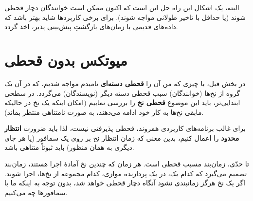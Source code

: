 \documentclass{book}
\newcommand{\clearemptydoublepage}{\newpage\cleardoublepage}
\begin{document}
    البته، یک اشکال این راه حل این است که اکنون ممکن است خوانندگان دچار قحطی شوند (یا حداقل با تاخیر طولانی مواجه شوند).  
    برای برخی کاربردها شاید بهتر باشد که داده‌های قدیمی با زمان‌های بازگشتِ پیش‌بینی‌ پذیر، اخذ گردد. 


\clearemptydoublepage
\section{میوتکس بدون قحطی}
\label{props}

    در بخش قبل، با چیزی که من آن را \textbf{قحطی دسته‌ای} نامیدم مواجه شدیم، که در آن یک گروه از نخ‌ها (خوانندگان) 
    سبب قحطی دسته دیگر (نویسندگان) می‌گردد. در  سطحی ابتدایی‌تر،‌ باید این موضوع \textbf{قحطی نخ} را بررسی نماییم (امکان 
    اینکه یک نخ در حالیکه مابقی نخ‌ها به کار خود ادامه می‌دهند، به صورت نامتناهی منتظر بماند). 
    
    
    برای غالب برنامه‌های کاربردی همروند، قحطی پذیرفتی نیست، لذا باید ضرورت \textbf{انتظار محدود}
    را اعمال کنیم، بدین معنی که زمان انتظار نخ بر روی یک سمافور (یا هر جای دیگری به همان منظور) باید ثبوتاً متناهی باشد. 

    تا حدّی، زمان‌بند مسبب قحطی است. هر زمان که چندین نخ آمادهٔ اجرا هستند، زمان‌بند تصمیم می‌گیرد که کدام یک، در یک پردازنده موازی،‌ کدام 
    مجموعه از نخ‌ها، اجرا شوند. اگر یک نخ هرگز زمانبندی نشود آنگاه دچار قحطی خواهد شد، بدون توجه به اینکه ما با سمافورها چه می‌کنیم. 
\end{document}
